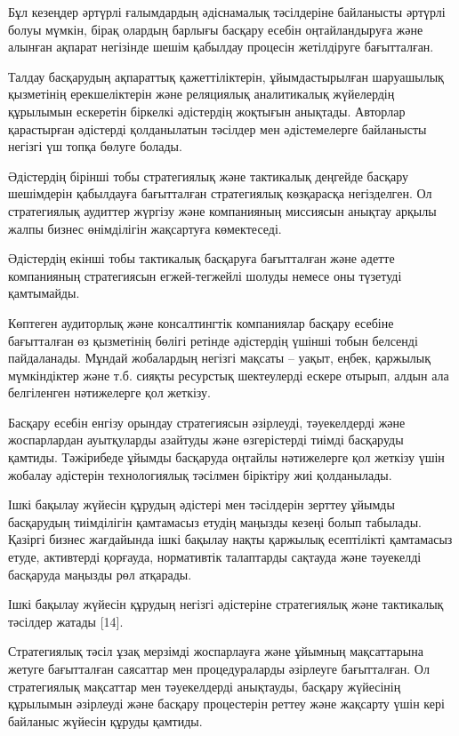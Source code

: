   
\begin{multicols}{2}

Бұл кезеңдер әртүрлі ғалымдардың әдіснамалық тәсілдеріне байланысты
әртүрлі болуы мүмкін, бірақ олардың барлығы басқару есебін
оңтайландыруға және алынған ақпарат негізінде шешім қабылдау процесін
жетілдіруге бағытталған.

Талдау басқарудың ақпараттық қажеттіліктерін, ұйымдастырылған шаруашылық
қызметінің ерекшеліктерін және реляциялық аналитикалық жүйелердің
құрылымын ескеретін біркелкі әдістердің жоқтығын анықтады. Авторлар
қарастырған әдістерді қолданылатын тәсілдер мен әдістемелерге байланысты
негізгі үш топқа бөлуге болады.

Әдістердің бірінші тобы стратегиялық және тактикалық деңгейде басқару
шешімдерін қабылдауға бағытталған стратегиялық көзқарасқа негізделген.
Ол стратегиялық аудиттер жүргізу және компанияның миссиясын анықтау
арқылы жалпы бизнес өнімділігін жақсартуға көмектеседі.

Әдістердің екінші тобы тактикалық басқаруға бағытталған және әдетте
компанияның стратегиясын егжей-тегжейлі шолуды немесе оны түзетуді
қамтымайды.

Көптеген аудиторлық және консалтингтік компаниялар басқару есебіне
бағытталған өз қызметінің бөлігі ретінде әдістердің үшінші тобын
белсенді пайдаланады. Мұндай жобалардың негізгі мақсаты -- уақыт, еңбек,
қаржылық мүмкіндіктер және т.б. сияқты ресурстық шектеулерді ескере
отырып, алдын ала белгіленген нәтижелерге қол жеткізу.

Басқару есебін енгізу орындау стратегиясын әзірлеуді, тәуекелдерді және
жоспарлардан ауытқуларды азайтуды және өзгерістерді тиімді басқаруды
қамтиды. Тәжірибеде ұйымды басқаруда оңтайлы нәтижелерге қол жеткізу
үшін жобалау әдістерін технологиялық тәсілмен біріктіру жиі қолданылады.

Ішкі бақылау жүйесін құрудың әдістері мен тәсілдерін зерттеу ұйымды
басқарудың тиімділігін қамтамасыз етудің маңызды кезеңі болып табылады.
Қазіргі бизнес жағдайында ішкі бақылау нақты қаржылық есептілікті
қамтамасыз етуде, активтерді қорғауда, нормативтік талаптарды сақтауда
және тәуекелді басқаруда маңызды рөл атқарады.

Ішкі бақылау жүйесін құрудың негізгі әдістеріне стратегиялық және
тактикалық тәсілдер жатады {[}14{]}.

Стратегиялық тәсіл ұзақ мерзімді жоспарлауға және ұйымның мақсаттарына
жетуге бағытталған саясаттар мен процедураларды әзірлеуге бағытталған.
Ол стратегиялық мақсаттар мен тәуекелдерді анықтауды, басқару жүйесінің
құрылымын әзірлеуді және басқару процестерін реттеу және жақсарту үшін
кері байланыс жүйесін құруды қамтиды.


\end{multicols}
